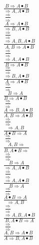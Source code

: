\documentclass[11pt]{article}
\begin{document}
\begin{center}

$\frac{B\Rightarrow A\bullet B}{\Rightarrow A, A\bullet B}$
\bigskip
\\$\frac{\Rightarrow }{\Rightarrow }$
\bigskip
\\$\frac{A\Rightarrow A\bullet B}{\Rightarrow B, A\bullet B}$
\bigskip
\\$\frac{\Rightarrow }{\Rightarrow }$
\bigskip
\\$\frac{\Rightarrow A, B, A\bullet B}{A, B\Rightarrow A\bullet B}$
\bigskip
\\$\frac{\Rightarrow }{\Rightarrow }$
\bigskip
\\$\frac{\Rightarrow A, A\bullet B}{B\Rightarrow A\bullet B}$
\bigskip
\\$\frac{\Rightarrow }{\Rightarrow }$
\bigskip
\\$\frac{\Rightarrow B, A\bullet B}{A\Rightarrow A\bullet B}$
\bigskip
\\$\frac{\Rightarrow }{\Rightarrow }$
\bigskip
\\$\frac{B\Rightarrow A}{B\Rightarrow A\bullet B}$
\bigskip
\\$\frac{\Rightarrow }{\Rightarrow }$
\bigskip
\\$\frac{A\Rightarrow B, A\bullet B}{A, B\Rightarrow A\bullet B}$
\bigskip
\\$\frac{\Rightarrow }{\Rightarrow }$
\bigskip
\\$\frac{\Rightarrow A, B}{A\bullet B\Rightarrow A}$
\bigskip
\\$\frac{\Rightarrow }{\Rightarrow }$
\bigskip
\\$\frac{A, B\Rightarrow }{B, A\bullet B\Rightarrow }$
\bigskip
\\$\frac{\Rightarrow }{\Rightarrow }$
\bigskip
\\$\frac{B\Rightarrow A}{\Rightarrow A, A\bullet B}$
\bigskip
\\$\frac{\Rightarrow }{\Rightarrow }$
\bigskip
\\$\frac{\Rightarrow A, A\bullet B}{B\Rightarrow A}$
\bigskip
\\$\frac{\Rightarrow }{\Rightarrow }$
\bigskip
\\$\frac{A\bullet B\Rightarrow A}{\Rightarrow A, B}$
\bigskip
\\$\frac{\Rightarrow }{\Rightarrow }$
\bigskip
\\$\frac{\Rightarrow A, B, A\bullet B}{B, A\bullet B\Rightarrow A}$
\bigskip
\\$\frac{\Rightarrow }{\Rightarrow }$
\bigskip
\\$\frac{A, B\Rightarrow A\bullet B}{A\Rightarrow B, A\bullet B}$

\end{center}
\end{document}
